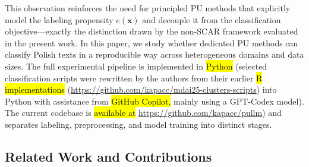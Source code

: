 \documentclass[applsci,article,accept,pdftex,moreauthors]{Definitions/mdpi}
\begin{document}
This observation reinforces the need for principled PU methods that explicitly model the labeling propensity $e(\mathbf{x})$ and decouple it from the classification objective---exactly the distinction drawn by the non-SCAR framework evaluated in the present work. In this paper, we study whether dedicated PU methods can classify Polish texts in a reproducible way across heterogeneous domains and data sizes. The full experimental pipeline is implemented in \hl{Python} %
 (selected classification scripts were rewritten by the authors from their earlier \hl{R} %
 \hl{implementations} %
 (\url{https://github.com/kapacc/mdai25-clusters-scripts}) into Python with assistance from \hl{GitHub Copilot,} %
 mainly using a GPT-Codex model). The current codebase is \hl{available at} %
 \url{https://github.com/kapacc/pullm}) and separates labeling, preprocessing, and model training into distinct stages.

\subsection*{Related Work and Contributions}
\end{document}
